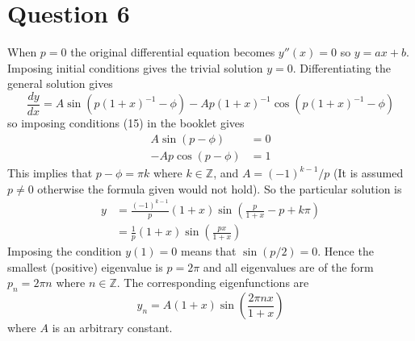 \documentclass[10pt,a4paper,notitlepage]{article}
\newcommand{\Z}{\mathbb{Z}}
\begin{document}
\section*{\centering \large Question 6}
When $p=0$ the original differential equation becomes $y''(x)=0$ so $y=ax+b$. Imposing initial conditions gives the trivial solution $y=0$.   Differentiating the general solution gives 
\begin{equation}
\frac{dy}{dx}=A\sin(p(1+x)^{-1}-\phi)-Ap(1+x)^{-1}\cos(p(1+x)^{-1}-\phi)
\end{equation} 
so imposing conditions (15) in the booklet gives
\begin{equation}
\begin{aligned}
A\sin(p-\phi) &= 0\\
-Ap\cos\left( p-\phi\right) &= 1
\end{aligned}
\end{equation}
This implies that $p-\phi=\pi k$ where $k\in \Z$, and $A=(-1)^{k-1}/p$ (It is assumed $p\neq 0$ otherwise the formula given would not hold).  So the particular solution is
\begin{equation}
\begin{aligned}
y &= \frac{(-1)^{k-1}}{p}\left(1+x\right) \sin \left( \frac{p}{1+x}-p+k\pi\right)\\
&= \frac{1}{p}\left(1+x\right) \sin \left( \frac{px}{1+x}\right)
\end{aligned}
\end{equation}
Imposing the condition $y(1)=0$ means that $\sin\left(p/2\right)=0$. Hence the smallest (positive) eigenvalue is $p=2\pi$ and all eigenvalues are of the form $p_{n}=2\pi n$ where $n\in\Z$.  The corresponding eigenfunctions are
\begin{equation}
y_{n}=A\left(1+x\right) \sin \left(\frac{2\pi nx}{1+x}\right)
\end{equation}
where $A$ is an arbitrary constant.
\end{document}

